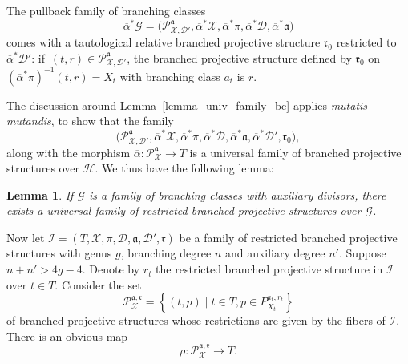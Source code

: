 \documentclass[10pt]{amsart}
\theoremstyle{definition}
\theoremstyle{plain}
\newtheorem{lemma}[definition]{Lemma}
\begin{document}
The pullback family of branching classes\vspace*{-3pt}
\[
\overline \alpha^*\mathcal G = \bigl(\mathcal P_{\mathcal X, \mathcal D'}^{\mathfrak a}, \overline \alpha^*\mathcal X, \overline \alpha^* \pi, \overline \alpha^* \mathcal D, \overline \alpha^* \mathfrak a\bigr)
\]
comes with a tautological relative branched projective structure $\mathfrak r_0$ restricted to $\overline \alpha^* \mathcal D'$: if~$(t, r) \in \mathcal P_{\mathcal X, \mathcal D'}^{\mathfrak a}$, the branched projective structure defined by $\mathfrak r_0$ on $\left(\overline \alpha^*\pi\right)^{-1}(t, r) = X_t$ with branching class $a_t$ is $r$.

The discussion around Lemma~\ref{lemma_univ_family_bc} applies \emph{mutatis mutandis}, to show that the family\vspace*{-3pt}
\[
\bigl(\mathcal P_{\mathcal X, \mathcal D'}^{\mathfrak a}, \overline \alpha^*\mathcal X, \overline \alpha^* \pi, \overline \alpha^* \mathcal D, \overline \alpha^* \mathfrak a, \overline \alpha^* \mathcal D', \mathfrak r_0\bigr),
\]
along with the morphism $\overline \alpha: \mathcal P_{\mathcal X}^{\mathfrak a} \to T$ is a universal family of branched projective structures over $\mathcal H$.
We thus have the following lemma:

\begin{lemma}\label{lemma_universal_family_rbps_over_bc}
If $\mathcal G$ is a family of branching classes with auxiliary divisors, there exists a universal family of restricted branched projective structures over $\mathcal G$.
\end{lemma}

Now let $\mathcal I = (T, \mathcal X, \pi, \mathcal D, \mathfrak a, \mathcal D', \mathfrak r)$ be a family of restricted branched projective structures with genus $g$, branching degree $n$ and auxiliary degree $n'$.
Suppose $n+n' > 4g-4$.
Denote by $r_t$ the restricted branched projective structure in $\mathcal I$ over $t \in T$.
Consider the set\vspace*{-3pt}
\begin{equation*}
\mathcal P_{\mathcal X}^{\mathfrak a, \mathfrak r} = \left\{(t, p)\mid t \in T, p \in P_{X_t}^{a_t, r_t}\right\}
\end{equation*}
of branched projective structures whose restrictions are given by the fibers of $\mathcal I$.
There is an obvious map\vspace*{-3pt}
\begin{equation*}
\rho: \mathcal P_{\mathcal X}^{\mathfrak a, \mathfrak r} \to T.
\end{equation*}
\end{document}
